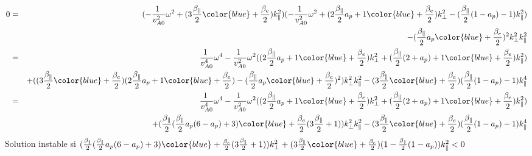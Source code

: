 \begin{eqnarray}
0 &=& (- \frac{1 }{v^2_{A0}} \omega^2  +(3\frac{\beta_{\parallel}}{2} {\color{blue}+ \frac{\beta_e}{2}})k^2_{\parallel}  ) ( - \frac{1 }{v^2_{A0}}\omega^2+(2\frac{\beta_{\parallel}}{2} a_p +1{\color{blue}+ \frac{\beta_e}{2}})k^2_{\perp} - (\frac{\beta_{\parallel}}{2}  (1 - a_p) -1) k^2_{\parallel}   ) \nonumber\\
&&- (\frac{\beta_{\parallel}}{2} a_p{\color{blue}+ \frac{\beta_e}{2}})^2  k^2_{\perp} k^2_{\parallel}  \nonumber\\
&=& \frac{1 }{v^4_{A0}} \omega^4 - \frac{1 }{v^2_{A0}} \omega^2 ((2\frac{\beta_{\parallel}}{2} a_p +1{\color{blue}+ \frac{\beta_e}{2}})k^2_{\perp} +(\frac{\beta_{\parallel}}{2} (2+a_p) +1{\color{blue}+ \frac{\beta_e}{2}}) k^2_{\parallel} ) \nonumber\\
&&+((3\frac{\beta_{\parallel}}{2} {\color{blue}+ \frac{\beta_e}{2}})(2\frac{\beta_{\parallel}}{2} a_p +1{\color{blue}+ \frac{\beta_e}{2}})- (\frac{\beta_{\parallel}}{2} a_p{\color{blue}+ \frac{\beta_e}{2}})^2 ) k^2_{\perp} k^2_{\parallel}  - (3\frac{\beta_{\parallel}}{2} {\color{blue}+ \frac{\beta_e}{2}})(\frac{\beta_{\parallel}}{2}  (1 - a_p) -1) k^4_{\parallel}  \nonumber\\
&=& \frac{1 }{v^4_{A0}} \omega^4 - \frac{1 }{v^2_{A0}} \omega^2 ((2\frac{\beta_{\parallel}}{2} a_p +1{\color{blue}+ \frac{\beta_e}{2}})k^2_{\perp} +(\frac{\beta_{\parallel}}{2} (2+a_p) +1{\color{blue}+ \frac{\beta_e}{2}}) k^2_{\parallel} ) \nonumber\\
&&+(\frac{\beta_{\parallel}}{2}(\frac{\beta_{\parallel}}{2}a_p (6  -  a_p)  +3) {\color{blue}+ \frac{\beta_e}{2} (3\frac{\beta_{\parallel}}{2} +1)}  ) k^2_{\perp} k^2_{\parallel}  - (3\frac{\beta_{\parallel}}{2} {\color{blue}+ \frac{\beta_e}{2}})(\frac{\beta_{\parallel}}{2}  (1 - a_p) -1) k^4_{\parallel}  \nonumber  
\end{eqnarray}
Solution instable si $(\frac{\beta_{\parallel}}{2}(\frac{\beta_{\parallel}}{2}a_p (6  -  a_p)  +3)  {\color{blue}+ \frac{\beta_e}{2} (3\frac{\beta_{\parallel}}{2} +1)} ) k^2_{\perp}  + (3\frac{\beta_{\parallel}}{2} {\color{blue}+ \frac{\beta_e}{2}})(1-\frac{\beta_{\parallel}}{2}  (1 - a_p) ) k^2_{\parallel}   <0$
